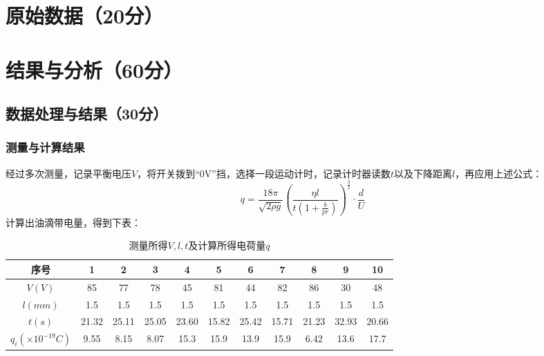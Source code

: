 \documentclass[yuxi]{../template/Report}%
\begin{document}
\begin{fullreportonly}
\section{原始数据（20分）}

\section{结果与分析（60分）}
\subsection{数据处理与结果（30分）}
\subsubsection{测量与计算结果}
经过多次测量，记录平衡电压$V$，将开关拨到“0V”挡，选择一段运动计时，记录计时器读数$t$以及下降距离$l$，再应用上述公式：
\[ q = \frac{18\pi}{\sqrt{2\rho g}} \left( \frac{\eta l}{t\left(1 + \frac{b}{pr}\right)} \right)^{\frac{3}{2}} \cdot \frac{d}{U} \]
计算出油滴带电量，得到下表：
\begin{table}[htbp]
  \centering
  \caption{测量所得$V,l,t$及计算所得电荷量$q$}
  \begin{tabular}{@{}ccccccccccc@{}}
    \toprule
    序号 & 1 & 2 & 3 & 4 & 5 & 6 & 7 & 8 & 9 & 10 \\
    \midrule
    \( V(V) \) & 85 & 77 & 78 & 45 & 81 & 44 & 82 & 86 & 30 & 48 \\
    \( l(mm) \) & 1.5 & 1.5 & 1.5 & 1.5 & 1.5 & 1.5 & 1.5 & 1.5 & 1.5 & 1.5 \\
    \( t(s) \) & 21.32 & 25.11 & 25.05 & 23.60 & 15.82 & 25.42 & 15.71 & 21.23 & 32.93 & 20.66 \\
    \( q_i(\times10^{-19}C) \) & 9.55 & 8.15 & 8.07 & 15.3 & 15.9 & 13.9 & 15.9 & 6.42 & 13.6 & 17.7 \\
    \bottomrule
  \end{tabular}
\end{table}


\end{fullreportonly}
\end{document}
